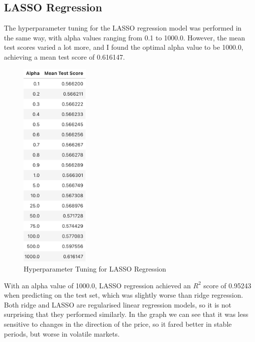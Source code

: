 \documentclass[a4paper, 11pt]{article}
\begin{document}
\subsection{LASSO Regression}
The hyperparameter tuning for the LASSO regression model was performed in the same way, with alpha values ranging from 0.1 to 1000.0. However, the mean test scores varied a lot more, and I found the optimal alpha value to be 1000.0, achieving a mean test score of 0.616147.

\begin{figure}[H]
    \begin{center}
        \includegraphics[width=0.3\textwidth]{Hyperparameter Tuning for LASSO Regression.png}
        \caption{Hyperparameter Tuning for LASSO Regression}
    \end{center}
\end{figure}

With an alpha value of 1000.0, LASSO regression achieved an $R^2$ score of 0.95243 when predicting on the test set, which was slightly worse than ridge regression. Both ridge and LASSO are regularised linear regression models, so it is not surprising that they performed similarly. In the graph we can see that it was less sensitive to changes in the direction of the price, so it fared better in stable periods, but worse in volatile markets. 
\end{document}
